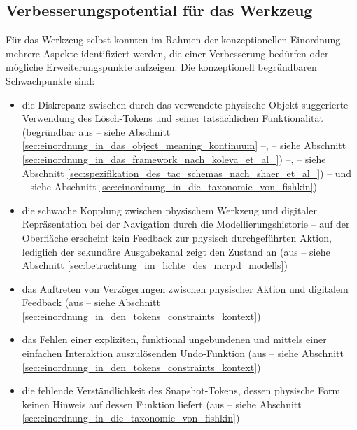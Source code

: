 
\subsection{Verbesserungspotential für das Werkzeug} %
\label{sub:verbesserungspotential_für_das_werkzeug}

Für das Werkzeug selbst konnten im Rahmen der konzeptionellen Einordnung mehrere Aspekte identifiziert werden, die einer Verbesserung bedürfen oder mögliche Erweiterungspunkte aufzeigen. Die konzeptionell begründbaren Schwachpunkte sind:
\begin{itemize}
	\item die Diskrepanz zwischen durch das verwendete physische Objekt suggerierte Verwendung des Lösch-Tokens und seiner tatsächlichen Funktionalität (begründbar aus \citep{Underkoffler99} -- siehe Abschnitt \ref{sec:einordnung_in_das_object_meaning_kontinuum} --, \citep{Koleva03} -- siehe Abschnitt \ref{sec:einordnung_in_das_framework_nach_koleva_et_al_}) --, \citep{Shaer04} -- siehe Abschnitt \ref{sec:spezifikation_des_tac_schemas_nach_shaer_et_al_}) -- und \citep{Fishkin04} -- siehe Abschnitt \ref{sec:einordnung_in_die_taxonomie_von_fishkin})
	\item die schwache Kopplung zwischen physischem Werkzeug und digitaler Repräsentation bei der Navigation durch die Modellierungshistorie -- auf der Oberfläche erscheint kein Feedback zur physisch durchgeführten Aktion, lediglich der sekundäre Ausgabekanal zeigt den Zustand an (aus \citep{Ullmer00} -- siehe Abschnitt \ref{sec:betrachtung_im_lichte_des_mcrpd_modells})
	\item das Auftreten von Verzögerungen zwischen physischer Aktion und digitalem Feedback (aus \citep{Bellotti02} -- siehe Abschnitt \ref{sec:einordnung_in_den_tokens_constraints_kontext})
	\item das Fehlen einer expliziten, funktional ungebundenen und mittels einer einfachen Interaktion auszulösenden Undo-Funktion (aus \citep{Bellotti02} -- siehe Abschnitt \ref{sec:einordnung_in_den_tokens_constraints_kontext})
	\item die fehlende Verständlichkeit des Snapshot-Tokens, dessen physische Form keinen Hinweis auf dessen Funktion liefert (aus \citep{Fishkin04} -- siehe Abschnitt \ref{sec:einordnung_in_die_taxonomie_von_fishkin})
\end{itemize}


